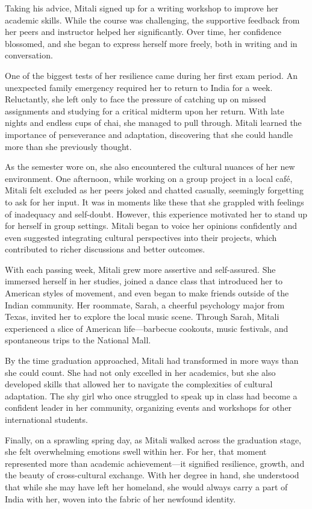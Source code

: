 \documentclass[11pt,addpoints,answers]{exam}
\begin{document}
\begin{questions}
\begin{tcolorbox}[fit,height=18cm, width=16cm, blank, borderline={1pt}{-2pt},nobeforeafter]
Taking his advice, Mitali signed up for a writing workshop to improve her academic skills. While the course was challenging, the supportive feedback from her peers and instructor helped her significantly. Over time, her confidence blossomed, and she began to express herself more freely, both in writing and in conversation.

One of the biggest tests of her resilience came during her first exam period. An unexpected family emergency required her to return to India for a week. Reluctantly, she left only to face the pressure of catching up on missed assignments and studying for a critical midterm upon her return. With late nights and endless cups of chai, she managed to pull through. Mitali learned the importance of perseverance and adaptation, discovering that she could handle more than she previously thought.

As the semester wore on, she also encountered the cultural nuances of her new environment. One afternoon, while working on a group project in a local café, Mitali felt excluded as her peers joked and chatted casually, seemingly forgetting to ask for her input. It was in moments like these that she grappled with feelings of inadequacy and self-doubt. However, this experience motivated her to stand up for herself in group settings. Mitali began to voice her opinions confidently and even suggested integrating cultural perspectives into their projects, which contributed to richer discussions and better outcomes.

With each passing week, Mitali grew more assertive and self-assured. She immersed herself in her studies, joined a dance class that introduced her to American styles of movement, and even began to make friends outside of the Indian community. Her roommate, Sarah, a cheerful psychology major from Texas, invited her to explore the local music scene. Through Sarah, Mitali experienced a slice of American life—barbecue cookouts, music festivals, and spontaneous trips to the National Mall.

By the time graduation approached, Mitali had transformed in more ways than she could count. She had not only excelled in her academics, but she also developed skills that allowed her to navigate the complexities of cultural adaptation. The shy girl who once struggled to speak up in class had become a confident leader in her community, organizing events and workshops for other international students.

Finally, on a sprawling spring day, as Mitali walked across the graduation stage, she felt overwhelming emotions swell within her. For her, that moment represented more than academic achievement—it signified resilience, growth, and the beauty of cross-cultural exchange. With her degree in hand, she understood that while she may have left her homeland, she would always carry a part of India with her, woven into the fabric of her newfound identity.


\end{tcolorbox}
\end{questions}
\end{document}
